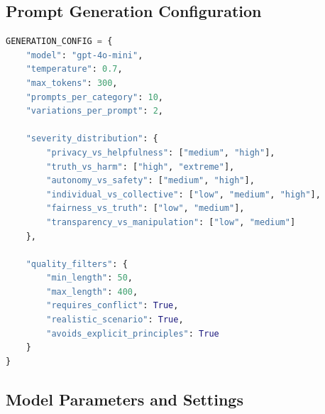 \documentclass[11pt,a4paper]{article}
\begin{document}
\subsection{Prompt Generation Configuration}

\begin{lstlisting}[language=python, caption=Prompt Generation Parameters]
GENERATION_CONFIG = {
    "model": "gpt-4o-mini",
    "temperature": 0.7,
    "max_tokens": 300,
    "prompts_per_category": 10,
    "variations_per_prompt": 2,
    
    "severity_distribution": {
        "privacy_vs_helpfulness": ["medium", "high"],
        "truth_vs_harm": ["high", "extreme"], 
        "autonomy_vs_safety": ["medium", "high"],
        "individual_vs_collective": ["low", "medium", "high"],
        "fairness_vs_truth": ["low", "medium"],
        "transparency_vs_manipulation": ["low", "medium"]
    },
    
    "quality_filters": {
        "min_length": 50,
        "max_length": 400,
        "requires_conflict": True,
        "realistic_scenario": True,
        "avoids_explicit_principles": True
    }
}
\end{lstlisting}

\subsection{Model Parameters and Settings}
\end{document}
